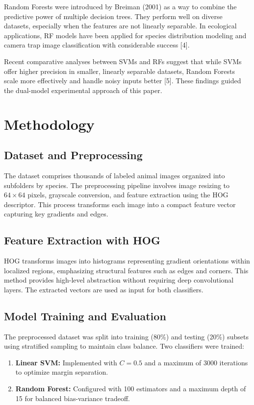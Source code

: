 \documentclass[conference]{IEEEtran}
\begin{document}
Random Forests were introduced by Breiman (2001) as a way to combine the predictive power of multiple decision trees. They perform well on diverse datasets, especially when the features are not linearly separable. In ecological applications, RF models have been applied for species distribution modeling and camera trap image classification with considerable success [4].  
\vspace{3pt}

Recent comparative analyses between SVMs and RFs suggest that while SVMs offer higher precision in smaller, linearly separable datasets, Random Forests scale more effectively and handle noisy inputs better [5]. These findings guided the dual-model experimental approach of this paper.  
\vspace{3pt}

\section{Methodology}
\subsection{Dataset and Preprocessing}
The dataset comprises thousands of labeled animal images organized into subfolders by species. The preprocessing pipeline involves image resizing to \(64 \times 64\) pixels, grayscale conversion, and feature extraction using the HOG descriptor. This process transforms each image into a compact feature vector capturing key gradients and edges.  

\subsection{Feature Extraction with HOG}
HOG transforms images into histograms representing gradient orientations within localized regions, emphasizing structural features such as edges and corners. This method provides high-level abstraction without requiring deep convolutional layers. The extracted vectors are used as input for both classifiers.

\subsection{Model Training and Evaluation}
The preprocessed dataset was split into training (80\%) and testing (20\%) subsets using stratified sampling to maintain class balance. Two classifiers were trained:
\begin{enumerate}
    \item \textbf{Linear SVM:} Implemented with \(C=0.5\) and a maximum of 3000 iterations to optimize margin separation.
    \item \textbf{Random Forest:} Configured with 100 estimators and a maximum depth of 15 for balanced bias-variance tradeoff.
\end{enumerate}
\end{document}

